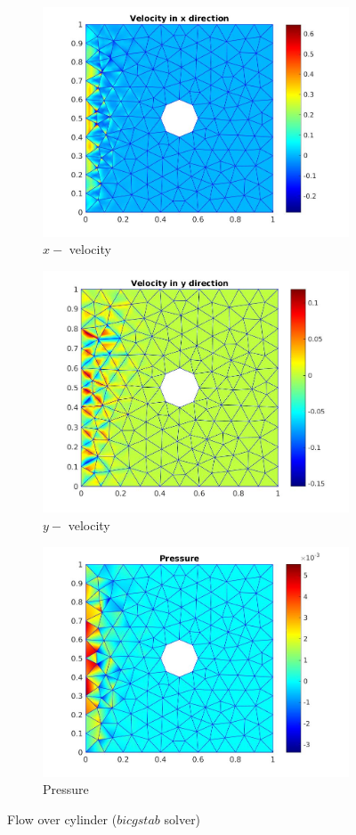 \documentclass[a4paper,twoside,openright]{book}
\begin{document}
\begin{figure}
\begin{subfigure}{\textwidth}	
  \includegraphics[width=0.8\linewidth]{cylinder_bicgstab_vx.jpg}
      \caption{$x-$ velocity}
    \label{x_vel_stoke_bicgstab}
\end{subfigure}
\begin{subfigure}{\textwidth}	
      \includegraphics[width=0.8\linewidth]{cylinder_bicgstab_vy.jpg}
    \caption{$y-$ velocity}
     \label{y_vel_stoke_bicgstab}
\end{subfigure}
\begin{subfigure}{\textwidth}	
    \includegraphics[width=0.8\linewidth]{cylinder_bicgstab_pressure.jpg}
    \caption{Pressure}
      \label{pressure_stoke_bicgstab}
\end{subfigure}
\caption{Flow over cylinder ($bicgstab$ solver)}
\label{flow_over_cylinder_bicgstab}
\end{figure}
\end{document}
